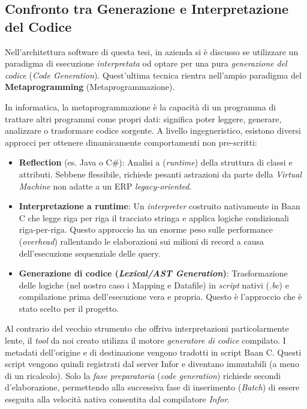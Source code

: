 \subsection{Confronto tra Generazione e Interpretazione del Codice}\label{subsec:confronto-tra-generazione-e-interpretazione-del-codice}
Nell'architettura software di questa tesi, in azienda si è discusso se utilizzare un paradigma di 
esecuzione \textit{interpretata} od optare per una pura \textit{generazione del codice} (\textit{Code Generation}).
Quest'ultima tecnica rientra nell'ampio paradigma del \textbf{Metaprogramming} (Metaprogrammazione). 

In informatica, la metaprogrammazione è la capacità di un programma di trattare altri programmi come propri dati: significa poter leggere, 
generare, analizzare o trasformare codice sorgente. 
A livello ingegneristico, esistono diversi approcci per ottenere dinamicamente comportamenti non pre-scritti:
\begin{itemize}
    \item \textbf{Reflection} (es. Java o C\#): Analisi a (\textit{runtime}) della struttura di classi e attributi. 
    Sebbene flessibile, richiede pesanti astrazioni da parte della \textit{Virtual Machine} non adatte a un ERP \textit{legacy-oriented}.
    \item \textbf{Interpretazione a runtime}: Un \textit{interpreter} costruito nativamente in Baan C che legge riga per riga il tracciato stringa e 
    applica logiche condizionali riga-per-riga. 
    Questo approccio ha un enorme peso sulle performance (\textit{overhead}) rallentando le elaborazioni 
    sui milioni di record a causa dell'esecuzione sequenziale delle query.
    \item \textbf{Generazione di codice (\textit{Lexical/AST Generation})}: Trasformazione delle logiche (nel nostro caso i Mapping e Datafile) in 
    \textit{script} nativi (\textit{.bc}) e compilazione prima dell'esecuzione vera e propria.
    Questo è l'approccio che è stato scelto per il progetto.
\end{itemize}

Al contrario del vecchio strumento che offriva interpretazioni particolarmente lente, il \textit{tool} da noi creato utilizza il 
motore \textit{generatore di codice} compilato. 
I metadati dell'origine e di destinazione vengono tradotti in script Baan C. Questi script vengono quindi registrati dal server Infor e 
diventano immutabili (a meno di un ricalcolo). Solo la \textit{fase preparatoria} (\textit{code generation}) richiede secondi d'elaborazione, 
permettendo alla successiva fase di inserimento (\textit{Batch}) di essere eseguita alla velocità nativa consentita dal compilatore \textit{Infor}.

